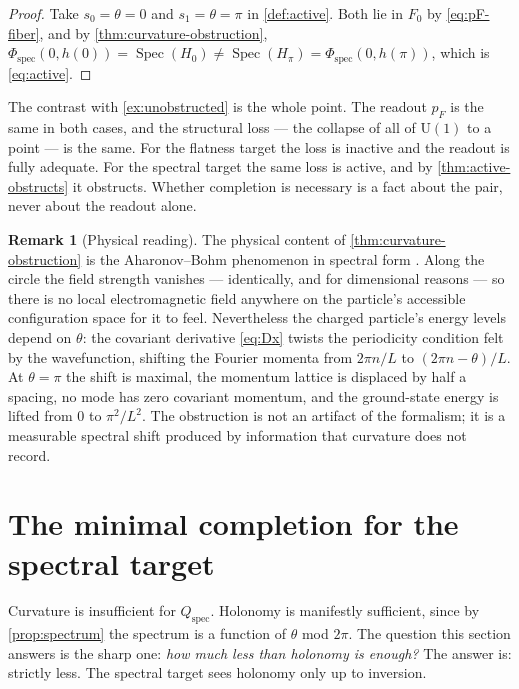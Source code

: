 \documentclass[11pt,reqno]{amsart}
\theoremstyle{plain}
\theoremstyle{definition}
\newtheorem{remark}[theorem]{Remark}
\newcommand{\Uone}{\mathrm{U}(1)}
\newcommand{\Spec}{\operatorname{Spec}}
\begin{document}
\begin{proof}
Take $s_0=\theta=0$ and $s_1=\theta=\pi$ in \cref{def:active}. Both lie in $F_0$ by
\eqref{eq:pF-fiber}, and by \cref{thm:curvature-obstruction},
$\Phi_{\mathrm{spec}}(0,h(0))=\Spec(H_0)\neq\Spec(H_\pi)=\Phi_{\mathrm{spec}}(0,h(\pi))$, which is
\eqref{eq:active}.
\end{proof}

The contrast with \cref{ex:unobstructed} is the whole point. The readout $p_F$ is the same in both
cases, and the structural loss --- the collapse of all of $\Uone$ to a point --- is the same. For
the flatness target the loss is inactive and the readout is fully adequate. For the spectral
target the same loss is active, and by \cref{thm:active-obstructs} it obstructs. Whether
completion is necessary is a fact about the pair, never about the readout alone.

\begin{remark}[Physical reading]\label{rem:physical-reading}
The physical content of \cref{thm:curvature-obstruction} is the Aharonov--Bohm phenomenon in
spectral form \cite{AharonovBohm,WuYang}. Along the circle the field strength vanishes ---
identically, and for dimensional reasons --- so there is no local electromagnetic field anywhere
on the particle's accessible configuration space for it to feel. Nevertheless
the charged particle's energy levels depend on $\theta$: the covariant derivative
\eqref{eq:Dx} twists the periodicity condition felt by the wavefunction, shifting the Fourier
momenta from $2\pi n/L$ to $(2\pi n-\theta)/L$. At $\theta=\pi$ the shift is maximal, the
momentum lattice is displaced by half a spacing, no mode has zero covariant momentum, and the
ground-state energy is lifted from $0$ to $\pi^2/L^2$. The obstruction is not an artifact of the
formalism; it is a measurable spectral shift produced by information that curvature does not
record.
\end{remark}

\section{The minimal completion for the spectral target}\label{sec:minimal-spectral}

Curvature is insufficient for $Q_{\mathrm{spec}}$. Holonomy is manifestly sufficient, since by
\cref{prop:spectrum} the spectrum is a function of $\theta$ mod $2\pi$. The question this section
answers is the sharp one: \emph{how much less than holonomy is enough?} The answer is: strictly
less. The spectral target sees holonomy only up to inversion.
\end{document}
